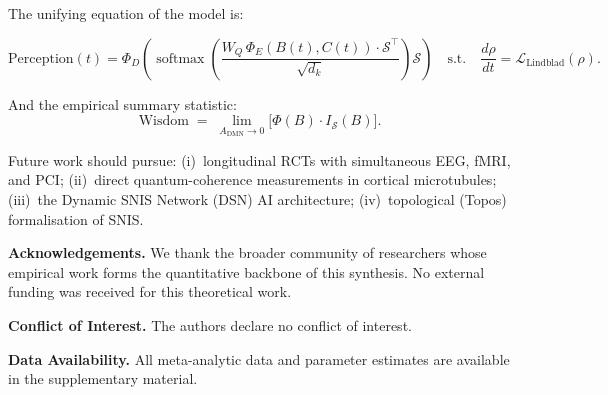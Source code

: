\documentclass[12pt,a4paper]{article}
\theoremstyle{plain}
\theoremstyle{definition}
\theoremstyle{remark}
\newcommand{\vS}{\mathcal{S}}
\newcommand{\DMN}{\mathrm{DMN}}
\newcommand{\softmax}{\operatorname{softmax}}
\begin{document}
\noindent The unifying equation of the model is:

\begin{tcolorbox}[mathbox, title={BQI Master Equation}]
\begin{equation}
  \boxed{
    \mathrm{Perception}(t) = \Phi_D\!\left(\softmax\!\left(
      \frac{W_Q\,\Phi_E(B(t),C(t))\cdot\vS^\top}{\sqrt{d_k}}
    \right)\vS\right)
    \quad\text{s.t.}\quad \frac{d\rho}{dt} = \mathcal{L}_{\text{Lindblad}}(\rho).
  }
\end{equation}
\end{tcolorbox}

\noindent And the empirical summary statistic:
\begin{equation}
  \mathrm{Wisdom} \;=\; \lim_{A_{\DMN}\to 0}\bigl[\Phi(B)\cdot I_\vS(B)\bigr].
\end{equation}

Future work should pursue: 
(i)~longitudinal RCTs with simultaneous EEG, fMRI, and PCI;
(ii)~direct quantum-coherence measurements in cortical microtubules;
(iii)~the Dynamic SNIS Network (DSN) AI architecture;
(iv)~topological (Topos) formalisation of SNIS.

\vspace{0.5cm}
\noindent\textbf{Acknowledgements.}
We thank the broader community of researchers whose empirical work forms the
quantitative backbone of this synthesis. No external funding was received for this theoretical work.

\noindent\textbf{Conflict of Interest.} The authors declare no conflict of interest.

\noindent\textbf{Data Availability.}
All meta-analytic data and parameter estimates are available in the supplementary material.

\appendix

\end{document}
